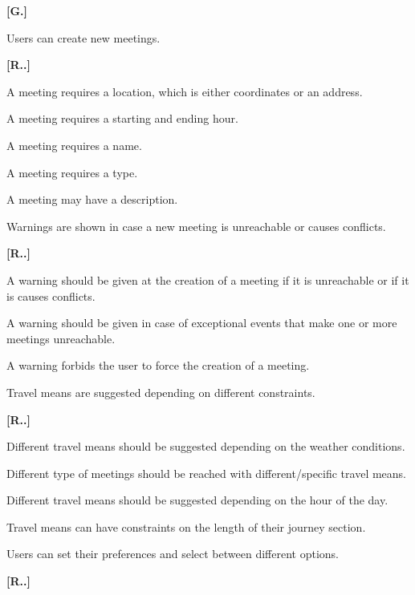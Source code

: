 \begin{list}
{\bfseries{}[G.]~}
{
}

\item Users can create new meetings.
\begin{list}
	{\bfseries{}[R..]~}
	{
	}
\item A meeting requires a location, which is either coordinates or an address.
\item A meeting requires a starting and ending hour.
\item A meeting requires a name.
\item A meeting requires a type.
\item A meeting may have a description.
\end{list}
\item Warnings are shown in case a new meeting is unreachable or causes conflicts.
\begin{list}
	{\bfseries{}[R..]~}
	{
	}
\item A warning should be given at the creation of a meeting if it is unreachable or if it is causes conflicts.
\item A warning should be given in case of exceptional events that make one or more meetings unreachable.
\item A warning forbids the user to force the creation of a meeting.
\end{list}
\item Travel means are suggested depending on different constraints.
\begin{list}
	{\bfseries{}[R..]~}
	{
	}
\item Different travel means should be suggested depending on the weather conditions.
\item Different type of meetings should be reached with different/specific travel means.
\item Different travel means should be suggested depending on the hour of the day.
\item Travel means can have constraints on the length of their journey section.
\end{list}
\item Users can set their preferences and select between different options.
\begin{list}
	{\bfseries{}[R..]~}

\end{list}
\end{list}
